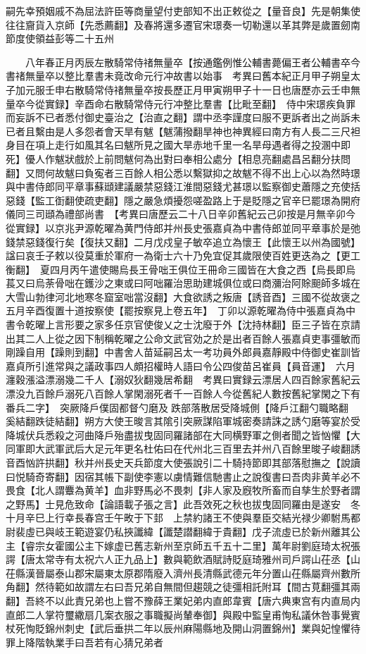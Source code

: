 嗣先幸預姻戚不為屈法許臣等商量望付吏部知不出正敕從之【量音良】先是朝集使往往齎貨入京師【先悉薦翻】及春將還多遷官宋璟奏一切勒還以革其弊是歲置劒南節度使領益彭等二十五州

　　八年春正月丙辰左散騎常侍禇無量卒【按通鑑例惟公輔書薨偏王者公輔書卒今書禇無量卒以整比羣書未竟改命元行冲故書以始事　考異曰舊本紀正月甲子朔皇太子加元服壬申右散騎常侍禇無量卒按長歷正月甲寅朔甲子十一日也唐歷亦云壬申無量卒今從實録】辛酉命右散騎常侍元行冲整比羣書【比毗至翻】　侍中宋璟疾負罪而妄訴不已者悉付御史臺治之【治直之翻】謂中丞李謹度曰服不更訴者出之尚訴未已者且繫由是人多怨者會天旱有魃【魃蒲撥翻旱神也神異經曰南方有人長二三尺袒身目在項上走行如風其名曰魃所見之國大旱赤地千里一名旱母遇者得之投溷中即死】優人作魃狀戲於上前問魃何為出對曰奉相公處分【相息亮翻處昌呂翻分扶問翻】又問何故魃曰負寃者三百餘人相公悉以繫獄抑之故魃不得不出上心以為然時璟與中書侍郎同平章事蘇頲建議嚴禁惡錢江淮間惡錢尤甚璟以監察御史蕭隱之充使括惡錢【監工衘翻使疏吏翻】隱之嚴急煩擾怨嗟盈路上于是貶隱之官辛巳罷璟為開府儀同三司頲為禮部尚書　【考異曰唐歷云二十八日辛卯舊紀云己卯按是月無辛卯今從實録】以京兆尹源乾曜為黄門侍郎并州長史張嘉貞為中書侍郎並同平章事於是弛錢禁惡錢復行矣【復扶又翻】二月戊戍皇子敏卒追立為懷王【此懷王以州為國號】諡曰哀壬子敕以役莫重於軍府一為衛士六十乃免宜促其歲限使百姓更迭為之【更工衡翻】　夏四月丙午遣使賜烏長王骨咄王俱位王冊命三國皆在大食之西【烏長即烏萇又曰烏荼骨咄在鑊沙之東或曰阿咄羅治思助建城俱位或曰商瀰治阿賖䫻師多城在大雪山勃律河北地寒冬窟室咄當沒翻】大食欲誘之叛唐【誘音酉】三國不從故褒之五月辛酉復置十道按察使【罷按察見上卷五年】　丁卯以源乾曜為侍中張嘉貞為中書令乾曜上言形要之家多任京官使俊乂之士沈廢于外【沈持林翻】臣三子皆在京請出其二人上從之因下制稱乾曜之公命文武官効之於是出者百餘人張嘉貞吏事彊敏而剛躁自用【躁則到翻】中書舍人苗延嗣呂太一考功員外郎員嘉靜殿中侍御史崔訓皆嘉貞所引進常與之議政事四人頗招權時人語曰令公四俊苗呂崔員【員音運】　六月瀍穀漲溢漂溺幾二千人【溺奴狄翻幾居希翻　考異曰實録云漂居人四百餘家舊紀云漂没九百餘戶溺死八百餘人掌閑溺死者千一百餘人今從舊紀人數按舊紀掌閑之下有番兵二字】　突厥降戶僕固都督勺磨及跌部落散居受降城側【降戶江翻勺職略翻奚結翻跌徒結翻】朔方大使王晙言其隂引突厥謀陷軍城密奏請誅之誘勺磨等宴於受降城伏兵悉殺之河曲降戶殆盡拔曳固同羅諸部在大同横野軍之側者聞之皆忷懼【大同軍即大武軍武后大足元年更名杜佑曰在代州北三百里去并州八百餘里晙子峻翻誘音酉忷許拱翻】秋并州長史天兵節度大使張說引二十騎持節即其部落慰撫之【說讀曰悦騎奇寄翻】因宿其帳下副使李憲以虜情難信馳書止之說復書曰吾肉非黄羊必不畏食【北人謂麞為黄羊】血非野馬必不畏刺【非人家及廐牧所畜而自孳生於野者謂之野馬】士見危致命【論語載子張之言】此吾效死之秋也拔曳固同羅由是遂安　冬十月辛巳上行幸長春宫壬午畋于下邽　上禁約諸王不使與羣臣交結光禄少卿駙馬都尉裴虛已與岐王範遊宴仍私挾讖緯【讖楚譛翻緯于貴翻】戊子流虛已於新州離其公主【睿宗女霍國公主下嫁虚已舊志新州至京師五千五十二里】萬年尉劉庭琦太祝張諤【唐太常寺有太祝六人正九品上】數與範飲酒賦詩貶庭琦雅州司戶諤山茌丞【山茌縣漢晉屬泰山郡宋屬東太原郡隋廢入濟州長清縣武德元年分置山茌縣屬齊州數所角翻】然待範如故謂左右曰吾兄弟自無間但趨競之徒彊相託附耳【間古莧翻彊其兩翻】吾終不以此責兄弟也上嘗不豫薛王業妃弟内直郎韋賓【唐六典東宫有内直局内直郎二人掌符璽繖扇几案衣服之事職擬尚輦奉御】與殿中監皇甫恂私議休咎事覺賓杖死恂貶錦州刺史【武后垂拱二年以辰州麻陽縣地及開山洞置錦州】業與妃惶懼待罪上降階執業手曰吾若有心猜兄弟者
